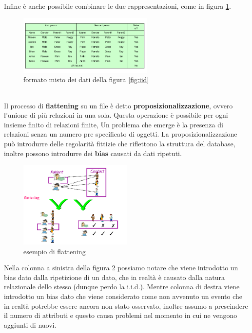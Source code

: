 Infine è anche possibile combinare le due rappresentazioni, come in figura \ref{fig:iid4}.
\begin{figure}
	\centering
	\includegraphics[width=0.6\textwidth]{pictures/familyComb.png}
	\caption{formato misto dei dati della figura \ref{fig:iid}}
	\label{fig:iid4}
\end{figure}\\
Il processo di \textbf{flattening} su un file è detto \textbf{proposizionalizzazione}, ovvero l'unione di più relazioni in una sola.
Questa operazione è possibile per ogni insieme finito di relazioni finite, Un problema che emerge è la presenza di relazioni senza un numero pre specificato di oggetti.
La proposizionalizzazione può introdurre delle regolarità fittizie che riflettono la struttura del database, inoltre possono introdurre dei \textbf{bias} causati da dati ripetuti.
\begin{figure}[H]
	\centering
	\includegraphics[width=0.5\textwidth]{pictures/flattening.png}
	\caption{esempio di flattening}
	\label{fig:flattening}
\end{figure}
\noindent
Nella colonna a sinistra della figura \ref{fig:flattening} possiamo notare che viene introdotto un bias dato dalla ripetizione di un dato, che in realtà è causato dalla natura relazionale dello stesso (dunque perdo la i.i.d.).
Mentre colonna di destra viene introdotto un bias dato che viene considerato come non avvenuto un evento che in realtà potrebbe essere ancora non stato osservato, inoltre assumo a prescindere il numero di attributi e questo causa problemi nel momento in cui ne vengono aggiunti di nuovi.
